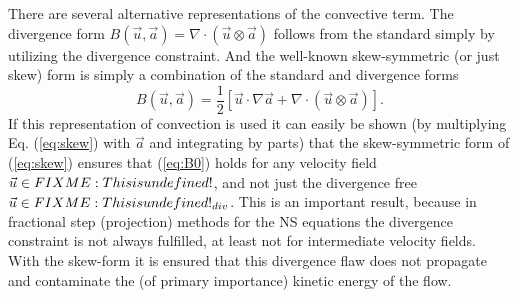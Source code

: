 There are several alternative representations of the convective
term. The divergence form $B(\vec{u},\vec{a})=\nabla \cdot
(\vec{u} \otimes \vec{a})$ follows from the standard simply by
utilizing the divergence constraint. And the well-known skew-symmetric
(or just skew) form is simply a combination of the standard and
divergence forms
\begin{equation}
 B(\vec{u},\vec{a}) = \frac{1}{2}\left[ \vec{u}\cdot \nabla \vec{a} + \nabla \cdot (\vec{u} \otimes \vec{a}) \right].
\label{eq:skew}
\end{equation}
If this representation of convection is used it can easily be shown
(by multiplying Eq. (\ref{eq:skew}) with $\vec{a}$ and integrating by
parts) that the skew-symmetric form of (\ref{eq:skew}) ensures that
(\ref{eq:B0}) holds for any velocity field $\vec{u} \in FIXME: This is undefined!$, and
not just the divergence free $\vec{u} \in FIXME: This is undefined!_{div}$. This is an
important result, because in fractional step (projection) methods for
the NS equations the divergence constraint is not always fulfilled, at
least not for intermediate velocity fields. With the skew-form it is
ensured that this divergence flaw does not propagate and contaminate
the (of primary importance) kinetic energy of the flow.


